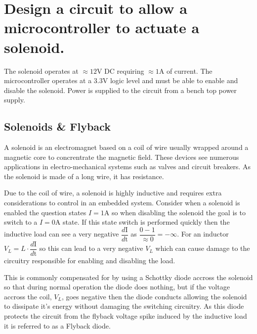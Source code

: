 \documentclass[main.tex]{subfiles}
\begin{document}
\section{Design a circuit to allow a microcontroller to actuate a solenoid.} \label{section:switching}

The solenoid operates at $\approx 12\text{V}$ DC requiring $\approx 1\text{A}$ of current. The microcontroller operates at a $3.3\text{V}$ logic level and must be able to enable and disable the solenoid. Power is supplied to the circuit from a bench top power supply. 

\spoilerline

\subsection{Solenoids \& Flyback}
A solenoid is an electromagnet based on a coil of wire usually wrapped around a magnetic core to concrentrate the magnetic field. These devices see numerous applications in electro-mechanical systems such as valves and circuit breakers. As the solenoid is made of a long wire, it has resistance. \newline

\newnoindentpara Due to the coil of wire, a solenoid is highly inductive and requires extra considerations to control in an embedded system. Consider when a solenoid is enabled the question states $I = 1\text{A}$ so when disabling the solenoid the goal is to switch to a $I = 0 \text{A}$ state. If this state switch is performed quickly then the inductive load can see a very negative $\dfrac{d\text{I}}{d\text{t}}$ as $\dfrac{0 - 1}{\approx 0} = - \infty$. For an inductor $V_L = L \cdot \dfrac{d\text{I}}{d\text{t}}$ so this can lead to a very negative $V_L$ which can cause damage to the circuitry responsible for enabling and disabling the load. \newline

\newnoindentpara This is commonly compensated for by using a Schottky diode accross the solenoid so that during normal operation the diode does nothing, but if the voltage accross the coil, $V_L$, goes negative then the diode conducts allowing the solenoid to dissipate it's energy without damaging the switching circuitry. As this diode protects the circuit from the flyback voltage spike induced by the inductive load it is referred to as a Flyback diode. 
\end{document}
